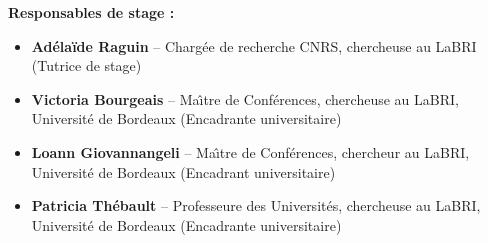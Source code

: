 \documentclass[11pt,a4paper,oneside]{article}
\begin{document}
\begin{titlepage}
\vspace{0.5cm}
\noindent\textbf{Responsables de stage :}
\begin{itemize}[leftmargin=1.5em, label=\textbullet, itemsep=0.3em]
  \item \textbf{Ad\'ela\"ide Raguin} -- Charg\'ee de recherche CNRS, chercheuse au LaBRI (Tutrice de stage)
  \item \textbf{Victoria Bourgeais} -- Ma\^\i tre de Conf\'erences, chercheuse au LaBRI, Universit\'e de Bordeaux (Encadrante universitaire)
  \item \textbf{Loann Giovannangeli} -- Ma\^\i tre de Conf\'erences, chercheur au LaBRI, Universit\'e de Bordeaux (Encadrant universitaire)
  \item \textbf{Patricia Th\'ebault} -- Professeure des Universit\'es, chercheuse au LaBRI, Universit\'e de Bordeaux (Encadrante universitaire)
\end{itemize}

\vfill
\end{titlepage}

\cleardoublepage
{}
\pagestyle{fancy}
\setcounter{page}{1}

\tableofcontents

\cleardoublepage


\cleardoublepage
\nocite{*}
\printbibliography[title={Bibliographie}]
\end{document}
